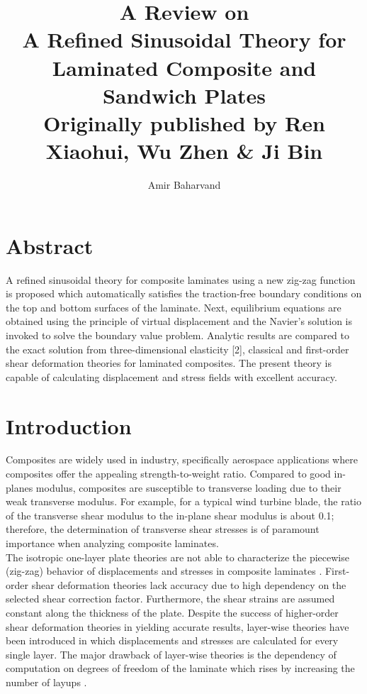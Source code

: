 \documentclass{article}
\title{A Review on \vspace{.2cm}\\ \huge \textbf{A Refined Sinusoidal Theory for Laminated Composite and Sandwich Plates} \vspace{.2cm}\\ \small Originally published by Ren Xiaohui, Wu Zhen \& Ji Bin}
\author{Amir Baharvand }
\date{}
\begin{document}
\maketitle


\tableofcontents

\section*{Abstract}
A refined sinusoidal theory for composite laminates using a new zig-zag function \cite{Xiaohui2020} is proposed which automatically satisfies the traction-free boundary conditions on the top and bottom surfaces of the laminate. Next, equilibrium equations are obtained using the principle of virtual displacement and the Navier's solution is invoked to solve the boundary value problem. Analytic results are compared to the exact solution from three-dimensional elasticity [2], classical and first-order shear deformation theories for laminated composites. The present theory is capable of calculating displacement and stress fields with excellent accuracy.

\section{Introduction}
Composites are widely used in industry, specifically aerospace applications where composites offer the appealing strength-to-weight ratio. Compared to good in-planes modulus, composites are susceptible to transverse loading due to their weak transverse modulus. For example, for a typical wind turbine blade, the ratio of the transverse shear modulus to the in-plane shear modulus is about 0.1; therefore, the determination of transverse shear stresses is of paramount importance when analyzing composite laminates. \\

The isotropic one-layer plate theories are not able to characterize the piecewise (zig-zag) behavior of displacements and stresses in composite laminates \cite{Carrera2003}. First-order shear deformation theories lack accuracy due to high dependency on the selected shear correction factor. Furthermore, the shear strains are assumed constant along the thickness of the plate.
Despite the success of higher-order shear deformation theories in yielding accurate results, layer-wise theories have been introduced in which displacements and stresses are calculated for every single layer. The major drawback of layer-wise theories is the dependency of computation on degrees of freedom of the laminate which rises by increasing the number of layups \cite{Li1995}. \\
\end{document}
